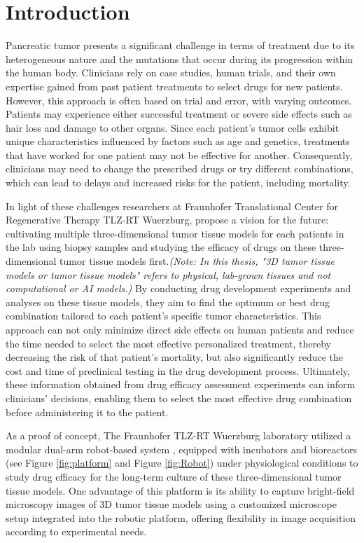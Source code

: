\chapter{Introduction}\label{ch:intro}

Pancreatic tumor presents a significant challenge in terms of treatment due to its heterogeneous nature and the mutations that occur during its progression within the human body. Clinicians rely on case studies, human trials, and their own expertise gained from past patient treatments to select drugs for new patients. However, this approach is often based on trial and error, with varying outcomes. Patients may experience either successful treatment or severe side effects such as hair loss and damage to other organs. Since each patient's tumor cells exhibit unique characteristics influenced by factors such as age and genetics, treatments that have worked for one patient may not be effective for another. Consequently, clinicians may need to change the prescribed drugs or try different combinations, which can lead to delays and increased risks for the patient, including mortality.

In light of these challenges researchers at Fraunhofer Translational Center for Regenerative Therapy TLZ-RT Wuerzburg,  propose a vision for the future: cultivating multiple three-dimensional tumor tissue models for each patients in the lab using biopsy samples and studying the efficacy of drugs on these three-dimensional tumor tissue models first.\textit{(Note: In this thesis, "3D tumor tissue models or tumor tissue models" refers to physical, lab-grown tissues and not computational or AI models.)} By conducting drug development experiments and analyses on these tissue models, they aim to find the optimum or best drug combination tailored to each patient's specific tumor characteristics. This approach can not only minimize direct side effects on human patients and reduce the time needed to select the most effective personalized treatment, thereby decreasing the risk of that patient's mortality, but also significantly reduce the cost and time of preclinical testing in the drug development process. Ultimately, these information obtained from drug efficacy assessment experiments can inform clinicians' decisions, enabling them to select the most effective drug combination before administering it to the patient.

As a proof of concept, The Fraunhofer TLZ-RT Wuerzburg laboratory utilized a modular dual-arm robot-based system \cite{Dembski2023Establishing}, equipped with incubators and bioreactors (see Figure \ref{fig:platform} and Figure \ref{fig:Robot}) under physiological conditions to study drug efficacy for the long-term culture of these three-dimensional tumor tissue models. One advantage of this platform is its ability to capture bright-field microscopy images of 3D tumor tissue models using a customized microscope setup integrated into the robotic platform, offering flexibility in image acquisition according to experimental needs.

